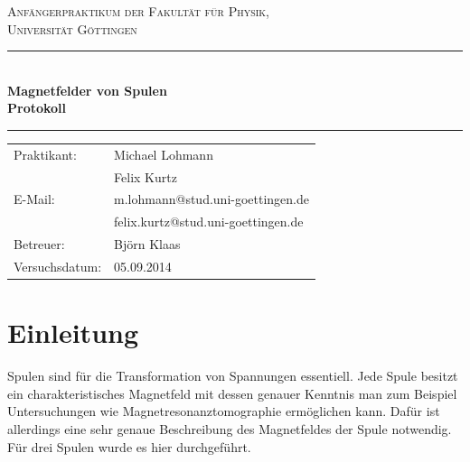 \documentclass[12pt,a4paper,titlepage,headinclude,bibtotoc]{scrartcl}
\begin{document}
\begin{titlepage}
\centering
\textsc{\Large Anfängerpraktikum der Fakultät für
  Physik,\\[1.5ex] Universität Göttingen}

\vspace*{3.5cm}

\rule{\textwidth}{1pt}\\[0.5cm]
{\huge \bfseries
  Magnetfelder von Spulen\\[1.5ex]
  Protokoll}\\[0.5cm]
\rule{\textwidth}{1pt}

\vspace*{3.5cm}

\begin{Large}
\begin{tabular}{ll}
Praktikant: &  Michael Lohmann\\
 &  Felix Kurtz\\
 E-Mail: & m.lohmann@stud.uni-goettingen.de\\
 &  felix.kurtz@stud.uni-goettingen.de\\
 Betreuer: & Björn Klaas\\
 Versuchsdatum: & 05.09.2014\\
\end{tabular}
\end{Large}

\vspace*{0.8cm}

\begin{Large}
\end{Large}

\end{titlepage}

\tableofcontents

\newpage

\section{Einleitung}
\label{sec:einleitung}
Spulen sind für die Transformation von Spannungen essentiell.
Jede Spule besitzt ein charakteristisches Magnetfeld mit dessen genauer Kenntnis man zum Beispiel Untersuchungen wie Magnetresonanztomographie ermöglichen kann.
Dafür ist allerdings eine sehr genaue Beschreibung des Magnetfeldes der Spule notwendig.
Für drei Spulen wurde es hier durchgeführt.
\end{document}
